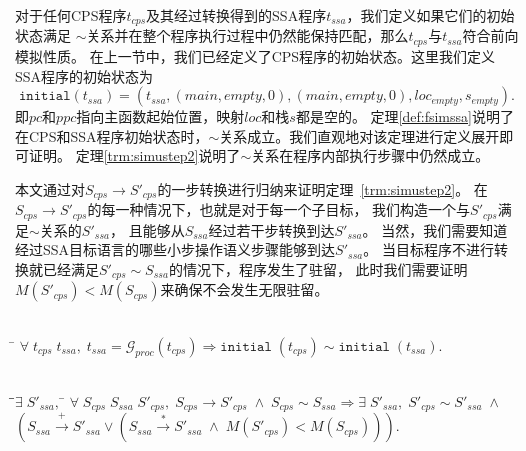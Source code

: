 对于任何CPS程序$t_{cps}$及其经过转换得到的SSA程序$t_{ssa}$，我们定义如果它们的初始状态满足
$\sim$关系并在整个程序执行过程中仍然能保持匹配，那么$t_{cps}$与$t_{ssa}$符合前向模拟性质。
在上一节中，我们已经定义了CPS程序的初始状态。这里我们定义SSA程序的初始状态为
\begin{equation}
\mathtt{initial}(t_{ssa}) = (t_{ssa}, (main, empty, 0), (main, empty, 0),loc_{empty}, s_{empty}).
\end{equation}
即$pc$和$ppc$指向主函数起始位置，映射$loc$和栈$s$都是空的。
定理\ref{def:fsimssa}说明了在CPS和SSA程序初始状态时，$\sim$关系成立。我们直观地对该定理进行定义展开即可证明。
定理\ref{trm:simustep2}说明了$\sim$关系在程序内部执行步骤中仍然成立。

本文通过对$S_{cps}\rightarrow S'_{cps}$的一步转换进行归纳来证明定理~\ref{trm:simustep2}。
在$S_{cps}\rightarrow S'_{cps}$的每一种情况下，也就是对于每一个子目标，
我们构造一个与$S'_{cps}$满足$\sim$关系的$S'_{ssa}$，
且能够从$S_{ssa}$经过若干步转换到达$S'_{ssa}$。
当然，我们需要知道经过SSA目标语言的哪些小步操作语义步骤能够到达$S'_{ssa}$。
当目标程序不进行转换就已经满足$S'_{cps}\sim S_{ssa}$的情况下，程序发生了驻留，
此时我们需要证明$M(S'_{cps})<M(S_{cps})$来确保不会发生无限驻留。

\begin{theorem}[CPS到SSA转换中初始状态的模拟]\label{def:fsimssa}
    \begin{tabbing}
      \\
        \quad\=\kill 
        \>$\forall\; t_{cps} \; t_{ssa},\;
        t_{ssa}=\mathcal{G}_{proc}(t_{cps})\Longrightarrow \mathtt{initial}\; (t_{cps})
        \sim \mathtt{initial}\; (t_{ssa}).$
    \end{tabbing}
  \end{theorem}

  \begin{theorem}[CPS到SSA转换中程序内部执行步骤的模拟]\label{trm:simustep2}
    \begin{tabbing}
      \\
    \quad\=\qquad\=$\exists\; S'_{ssa},\; $\=\kill
    \>$\forall \; S_{cps}\; S_{ssa}\; S'_{cps},\; S_{cps}\rightarrow S'_{cps}\; \wedge \; S_{cps}\sim S_{ssa} \Longrightarrow \exists\; S'_{ssa},\; S'_{cps}\sim S'_{ssa}\; \wedge$\\
    \>\>$(S_{ssa}\xrightarrow{+} S'_{ssa} \lor  (S_{ssa}\xrightarrow{*} S'_{ssa}\; \wedge \;  M(S'_{cps})<M(S_{cps})))$.
    \end{tabbing}
  \end{theorem}

